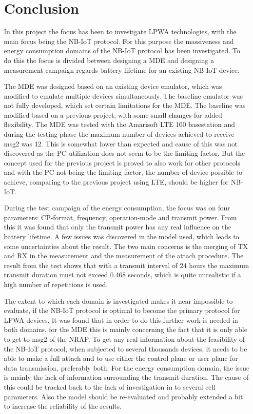 \chapter{Conclusion}
In this project the focus has been to investigate LPWA technologies, with the main focus being the NB-IoT protocol. For this purpose the massiveness and energy consumption domains of the NB-IoT protocol has been investigated. To do this the focus is divided between designing a MDE and designing a measurement campaign regards battery lifetime for an existing NB-IoT device. 

The MDE was designed based on an existing device emulator, which was modified to emulate multiple devices simultaneously. The baseline emulator was not fully developed, which set certain limitations for the MDE. The baseline was modified based on a previous project, with some small changes for added flexibility. The MDE was tested with the Amarisoft LTE 100 basestation and during the testing phase the maximum number of devices achieved to receive msg2 was 12. This is somewhat lower than expected and cause of this was not discovered as the PC utilization does not seem to be the limiting factor. But the concept used for the previous project is proved to also work for other protocols and with the PC not being the limiting factor, the number of device possible to achieve, comparing to the previous project using LTE, should be higher for NB-IoT.

During the test campaign of the energy consumption, the focus was on four parameters: CP-format, frequency, operation-mode and transmit power. From this it was found that only the transmit power has any real influence on the battery lifetime. A few issues was discovered in the model used, which leads to some uncertainties about the result. The two main concerns is the merging of TX and RX in the measurement and the measurement of the attach procedure. The result from the test shows that with a transmit interval of 24 hours the maximum transmit duration must not exceed 0.468 seconds, which is quite unrealistic if a high number of repetitions is used. 

The extent to which each domain is investigated makes it near impossible to evaluate, if the NB-IoT protocol is optimal to become the primary protocol for LPWA devices. It was found that in order to do this further work is needed in both domains, for the MDE this is mainly concerning the fact that it is only able to get to msg2 of the NRAP. To get any real information about the feasibility of the NB-IoT protocol, when subjected to several thousands devices, it needs to be able to make a full attach and to use either the control plane or user plane for data transmission, preferably both. For the energy consumption domain, the issue is mainly the lack of information surrounding the transmit duration. The cause of this could be tracked back to the lack of investigation in to several cell parameters. Also the model should be re-evaluated and probably extended a bit to increase the reliability of the results. 




